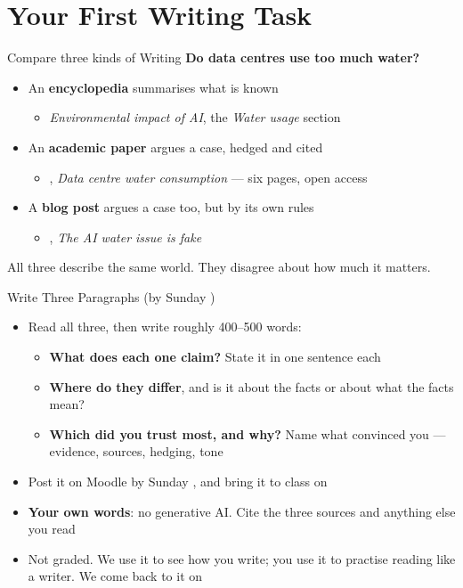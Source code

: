 \documentclass[aspectratio=169]{beamer}
\begin{document}
\section{Your First Writing Task}

\begin{frame}{Compare three kinds of Writing}
\textbf{Do data centres use too much water?}
\begin{itemize}
  \item An \textbf{encyclopedia} summarises what is known
    \begin{itemize}
    \item \emph{Environmental impact of AI}, the \emph{Water usage} section
      \citep{WikiEnvAI}
    \end{itemize}
  \item An \textbf{academic paper} argues a case, hedged and cited
    \begin{itemize}
    \item \citet{Mytton2021}, \emph{Data centre water consumption} --- six
      pages, open access
    \end{itemize}
  \item A \textbf{blog post} argues a case too, but by its own rules
    \begin{itemize}
    \item \citet{Masley2025Water}, \emph{The AI water issue is fake}
    \end{itemize}
\end{itemize}
\vspace{1ex}
All three describe the same world.  They disagree about how much it matters.
\end{frame}

\begin{frame}{Write Three Paragraphs (by Sunday \deadlineTask)}
\begin{itemize}
  \item Read all three, then write roughly 400--500 words:
    \begin{itemize}
    \item \textbf{What does each one claim?}  State it in one sentence each
    \item \textbf{Where do they differ}, and is it about the facts or about
      what the facts mean?
    \item \textbf{Which did you trust most, and why?}  Name what convinced
      you --- evidence, sources, hedging, tone
    \end{itemize}
  \item Post it on Moodle by Sunday \deadlineTask, and bring it to class on \dateSources
  \item \textbf{Your own words}: no generative AI.  Cite the three sources and anything else you read
  \item Not graded.  We use it to see how you write; you use it to practise
    reading like a writer.  We come back to it on \dateSources
\end{itemize}
\end{frame}
\end{document}
